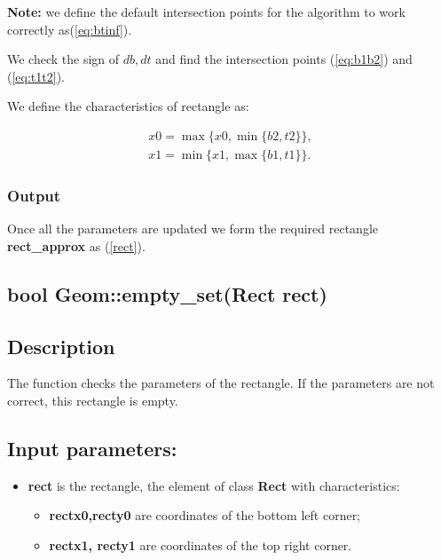 \documentclass{report}
\begin{document}
\begin{itemize}
\begin{itemize}
		{\bfseries Note:} we define the default intersection points for the algorithm to work correctly as(\ref{eq:btinf}).
		
		We check the sign of $db, dt$ and find the intersection points  (\ref{eq:b1b2}) and (\ref{eq:t1t2}).
		
		We define the characteristics of rectangle as:
		
		\begin{equation}
			\begin{gathered}
				x0 = \max\{x0, \min\{b2, t2\}\},\\
				x1 = \min\{x1, \max\{b1, t1\}\}.
			\end{gathered}
		\end{equation}
		
	\end{itemize}	
\end{itemize}

\subsubsection*{Output}

Once all the parameters are updated we form the required rectangle {\bfseries rect\_approx} as (\ref{rect}).

\newpage
\begin{center} 
	\section*{\bfseries bool Geom::empty\_set(Rect rect)}
\end{center} 

\subsection*{Description}

The function checks the parameters of the rectangle. If the parameters are not correct, this rectangle is empty. 

\subsection*{Input parameters:}

\begin{itemize}
	\item {\bfseries	rect} is the rectangle, the element of class {\bfseries Rect} with characteristics:
	
	\begin{itemize}
		\item {\bfseries rectx0,recty0} are coordinates of the bottom left corner;
		\item {\bfseries rectx1, recty1} are coordinates of the top right corner.
	\end{itemize}
\end{itemize}
\end{document}
